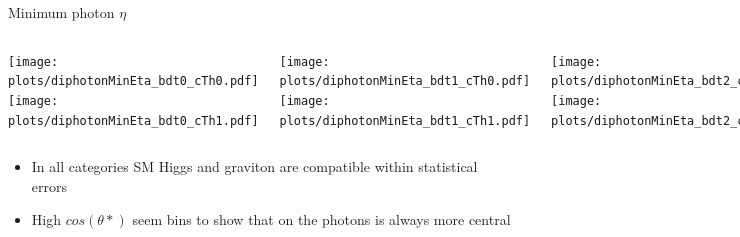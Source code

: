 \documentclass[8pt]{beamer}
\begin{document}
\begin{frame}{Minimum photon $\eta$}

  \begin{block}
   
     \begin{columns}
     
      \centering
     
      \column[t]{3.0cm}
      \texttt{[image: plots/diphotonMinEta\_bdt0\_cTh0.pdf]} \\
      \texttt{[image: plots/diphotonMinEta\_bdt0\_cTh1.pdf]} 
      
      \column[t]{3.0cm}
      \texttt{[image: plots/diphotonMinEta\_bdt1\_cTh0.pdf]} \\
      \texttt{[image: plots/diphotonMinEta\_bdt1\_cTh1.pdf]}
      
      \column[t]{3.0cm}
      \texttt{[image: plots/diphotonMinEta\_bdt2\_cTh0.pdf]} \\
      \texttt{[image: plots/diphotonMinEta\_bdt2\_cTh1.pdf]}
      
      \column[t]{3.0cm}
      \texttt{[image: plots/diphotonMinEta\_bdt3\_cTh0.pdf]} \\
      \texttt{[image: plots/diphotonMinEta\_bdt3\_cTh1.pdf]}
      
    \end{columns}
  
  \end{block}

  \begin{itemize}
    \item In all categories SM Higgs and graviton are compatible within statistical errors
    \item High $cos(\theta *)$ seem bins to show that on the photons is always more central
  \end{itemize}
  
\end{frame}
\end{document}
